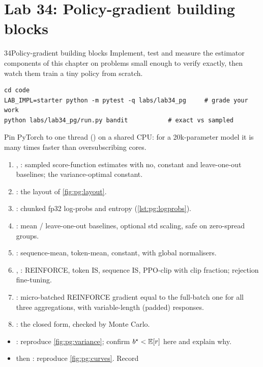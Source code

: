 \section{Lab 34: Policy-gradient building blocks}\label{sec:pg:lab}
\begin{labbox}{34}{Policy-gradient building blocks}
Implement, test and measure the estimator components of this chapter on problems small enough
to verify exactly, then watch them train a tiny policy from scratch.
\begin{lstlisting}[style=shell]
cd code
LAB_IMPL=starter python -m pytest -q labs/lab34_pg     # grade your work
python labs/lab34_pg/run.py bandit           # exact vs sampled
\end{lstlisting}
Pin PyTorch to one thread () on a shared CPU: for a 20k-parameter
model it is many times faster than oversubscribing cores.
\begin{enumerate}
\item {}, : sampled score-function estimates with no,
  constant and leave-one-out baselines; the variance-optimal constant.
\item {}: the layout of \cref{fig:pg:layout}.
\item {}: chunked fp32 log-probs and entropy (\cref{lst:pg:logprobs}).
\item {}: mean / leave-one-out baselines, optional std scaling, safe on
  zero-spread groups.
\item {}: sequence-mean, token-mean, constant, with global normalisers.
\item {}, : REINFORCE, token IS, sequence IS, PPO-clip
  with clip fraction; rejection fine-tuning.
\item {}: micro-batched REINFORCE gradient equal to the full-batch one
  for all three aggregations, with variable-length (padded) responses.
\item {}: the closed form, checked by Monte Carlo.
\end{enumerate}
\begin{itemize}
\item {}: reproduce \cref{fig:pg:variance}; confirm $b^\star<\mathbb{E}[r]$ here and explain why.
\item {} then : reproduce \cref{fig:pg:curves}. Record

\end{itemize}
\end{labbox}
